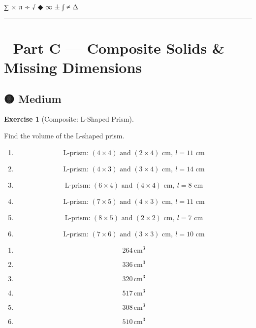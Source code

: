 \documentclass[
  letterpaper,
  DIV=11,
  numbers=noendperiod]{scrreprt}
\theoremstyle{definition}
\newtheorem{exercise}{Exercise}[chapter]
\theoremstyle{remark}
\begin{document}
∑ × π ÷ √ ◆ ∞ ± ∫ ≠ Δ

\begin{center}\rule{0.5\linewidth}{0.5pt}\end{center}

\section{🧩 Part C --- Composite Solids \& Missing
Dimensions}\label{sec-composite}

\subsection{🟡 Medium}

\begin{exercise}[Composite: L-Shaped
Prism]\protect\hypertarget{exr-comp-3}{}\label{exr-comp-3}

Find the volume of the L-shaped prism.

\begin{enumerate}
\def\labelenumi{\alph{enumi})}
\item
  \[\text{L-prism: }(4\times4)\text{ and }(2\times4)\text{ cm},\ l=11\text{ cm}\]
\item
  \[\text{L-prism: }(4\times3)\text{ and }(3\times4)\text{ cm},\ l=14\text{ cm}\]
\item
  \[\text{L-prism: }(6\times4)\text{ and }(4\times4)\text{ cm},\ l=8\text{ cm}\]
\item
  \[\text{L-prism: }(7\times5)\text{ and }(4\times3)\text{ cm},\ l=11\text{ cm}\]
\item
  \[\text{L-prism: }(8\times5)\text{ and }(2\times2)\text{ cm},\ l=7\text{ cm}\]
\item
  \[\text{L-prism: }(7\times6)\text{ and }(3\times3)\text{ cm},\ l=10\text{ cm}\]
\end{enumerate}

\begin{tcolorbox}[enhanced jigsaw, opacitybacktitle=0.6, coltitle=black, arc=.35mm, colframe=quarto-callout-tip-color-frame, colback=white, bottomrule=.15mm, left=2mm, colbacktitle=quarto-callout-tip-color!10!white, titlerule=0mm, opacityback=0, title=\textcolor{quarto-callout-tip-color}{\faLightbulb}\hspace{0.5em}{🔍 View Solution}, leftrule=.75mm, breakable, rightrule=.15mm, bottomtitle=1mm, toptitle=1mm, toprule=.15mm]

\begin{enumerate}
\def\labelenumi{\alph{enumi})}
\item
  \[264\,\text{cm}^{3}\]
\item
  \[336\,\text{cm}^{3}\]
\item
  \[320\,\text{cm}^{3}\]
\item
  \[517\,\text{cm}^{3}\]
\item
  \[308\,\text{cm}^{3}\]
\item
  \[510\,\text{cm}^{3}\]
\end{enumerate}


\end{tcolorbox}
\end{exercise}
\end{document}
